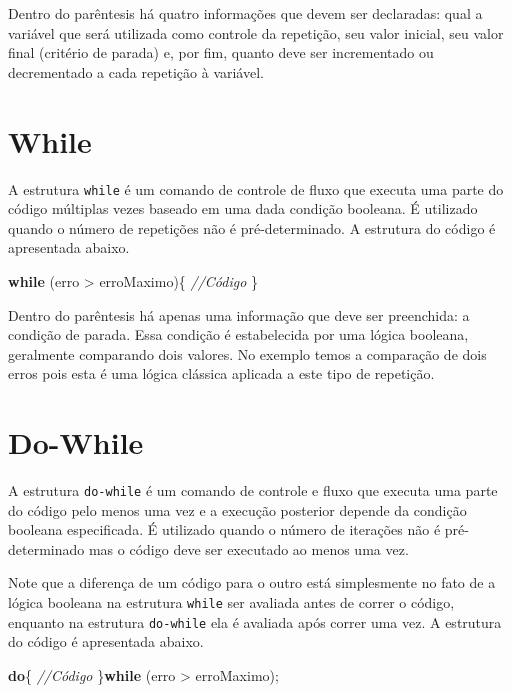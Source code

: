 \documentclass[
]{book}
\newenvironment{Shaded}{\begin{snugshade}}{\end{snugshade}}
\newcommand{\CommentTok}[1]{\textcolor[rgb]{0.56,0.35,0.01}{\textit{#1}}}
\newcommand{\KeywordTok}[1]{\textcolor[rgb]{0.13,0.29,0.53}{\textbf{#1}}}
\newcommand{\NormalTok}[1]{#1}
\begin{document}
Dentro do parêntesis há quatro informações que devem ser declaradas: qual a variável que será utilizada como controle da repetição, seu valor inicial, seu valor final (critério de parada) e, por fim, quanto deve ser incrementado ou decrementado a cada repetição à variável.

\hypertarget{while}{%
\section{While}\label{while}}

A estrutura \texttt{while} é um comando de controle de fluxo que executa uma parte do código múltiplas vezes baseado em uma dada condição booleana. É utilizado quando o número de repetições não é pré-determinado. A estrutura do código é apresentada abaixo.

\begin{Shaded}
\begin{Highlighting}[]
\KeywordTok{while}\NormalTok{ (erro > erroMaximo)\{}
    \CommentTok{//Código}
\NormalTok{\}}
\end{Highlighting}
\end{Shaded}

Dentro do parêntesis há apenas uma informação que deve ser preenchida: a condição de parada. Essa condição é estabelecida por uma lógica booleana, geralmente comparando dois valores. No exemplo temos a comparação de dois erros pois esta é uma lógica clássica aplicada a este tipo de repetição.

\hypertarget{do-while}{%
\section{Do-While}\label{do-while}}

A estrutura \texttt{do-while} é um comando de controle e fluxo que executa uma parte do código pelo menos uma vez e a execução posterior depende da condição booleana especificada. É utilizado quando o número de iterações não é pré-determinado mas o código deve ser executado ao menos uma vez.

Note que a diferença de um código para o outro está simplesmente no fato de a lógica booleana na estrutura \texttt{while} ser avaliada antes de correr o código, enquanto na estrutura \texttt{do-while} ela é avaliada após correr uma vez. A estrutura do código é apresentada abaixo.

\begin{Shaded}
\begin{Highlighting}[]
\KeywordTok{do}\NormalTok{\{}
    \CommentTok{//Código}
\NormalTok{\}}\KeywordTok{while}\NormalTok{ (erro > erroMaximo);}
\end{Highlighting}
\end{Shaded}
\end{document}
